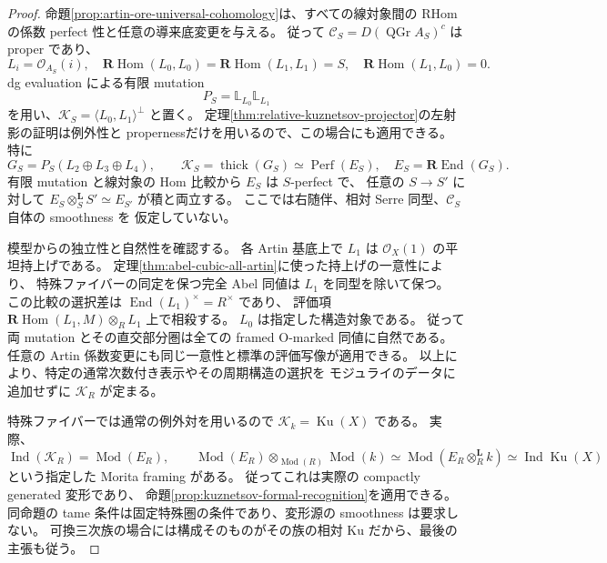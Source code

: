 \begin{proof}
命題\ref{prop:artin-ore-universal-cohomology}は、すべての線対象間の
RHom の係数 perfect 性と任意の導来底変更を与える。
従って $\mathcal C_S=D(\operatorname{QGr}A_S)^c$ は proper であり、
\[
 L_i=\mathcal O_{A_S}(i),\quad
 \mathbf R\operatorname{Hom}(L_0,L_0)=
 \mathbf R\operatorname{Hom}(L_1,L_1)=S,\quad
 \mathbf R\operatorname{Hom}(L_1,L_0)=0.
\]
dg evaluation による有限 mutation
\[
 P_S=\mathbb L_{L_0}\mathbb L_{L_1}
\]
を用い、$\mathcal K_S=\langle L_0,L_1\rangle^\perp$ と置く。
定理\ref{thm:relative-kuznetsov-projector}の左射影の証明は例外性と
propernessだけを用いるので、この場合にも適用できる。
特に
\[
 G_S=P_S(L_2\oplus L_3\oplus L_4),\qquad
 \mathcal K_S=\operatorname{thick}(G_S)
             \simeq\operatorname{Perf}(E_S),\quad
 E_S=\mathbf R\operatorname{End}(G_S).
\]
有限 mutation と線対象の Hom 比較から $E_S$ は $S$-perfect で、
任意の $S\to S'$ に対して
$E_S\otimes_S^{\mathbf L}S'\simeq E_{S'}$ が積と両立する。
ここでは右随伴、相対 Serre 同型、$\mathcal C_S$ 自体の smoothness を
仮定していない。

模型からの独立性と自然性を確認する。
各 Artin 基底上で $L_1$ は $\mathcal O_X(1)$ の平坦持上げである。
定理\ref{thm:abel-cubic-all-artin}に使った持上げの一意性により、
特殊ファイバーの同定を保つ完全 Abel 同値は $L_1$ を同型を除いて保つ。
この比較の選択差は $\operatorname{End}(L_1)^\times=R^\times$ であり、
評価項 $\mathbf R\operatorname{Hom}(L_1,M)\otimes_R L_1$ 上で相殺する。
$L_0$ は指定した構造対象である。
従って両 mutation とその直交部分圏は全ての framed O-marked 同値に自然である。
任意の Artin 係数変更にも同じ一意性と標準の評価写像が適用できる。
以上により、特定の通常次数付き表示やその周期構造の選択を
モジュライのデータに追加せずに $\mathcal K_R$ が定まる。

特殊ファイバーでは通常の例外対を用いるので
$\mathcal K_k=\operatorname{Ku}(X)$ である。
実際、
\[
 \operatorname{Ind}(\mathcal K_R)=\operatorname{Mod}(E_R),\qquad
 \operatorname{Mod}(E_R)\otimes_{\operatorname{Mod}(R)}
                 \operatorname{Mod}(k)
 \simeq\operatorname{Mod}(E_R\otimes_R^{\mathbf L}k)
 \simeq\operatorname{Ind}\operatorname{Ku}(X)
\]
という指定した Morita framing がある。
従ってこれは実際の compactly generated 変形であり、
命題\ref{prop:kuznetsov-formal-recognition}を適用できる。
同命題の tame 条件は固定特殊圏の条件であり、変形源の smoothness は要求しない。
可換三次族の場合には構成そのものがその族の相対 Ku だから、最後の主張も従う。
\end{proof}

